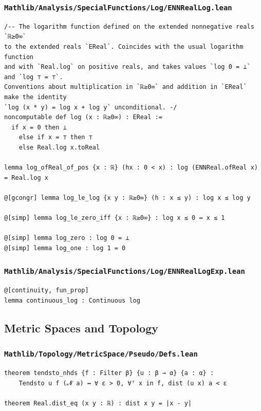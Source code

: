 \subsubsection{\texttt{Mathlib/Analysis/SpecialFunctions/Log/ENNRealLog.lean}}
\begin{lstlisting}[language=lean]
/-- The logarithm function defined on the extended nonnegative reals `ℝ≥0∞`
to the extended reals `EReal`. Coincides with the usual logarithm function
and with `Real.log` on positive reals, and takes values `log 0 = ⊥` and `log ⊤ = ⊤`.
Conventions about multiplication in `ℝ≥0∞` and addition in `EReal` make the identity
`log (x * y) = log x + log y` unconditional. -/
noncomputable def log (x : ℝ≥0∞) : EReal :=
  if x = 0 then ⊥
    else if x = ⊤ then ⊤
    else Real.log x.toReal

lemma log_ofReal_of_pos {x : ℝ} (hx : 0 < x) : log (ENNReal.ofReal x) = Real.log x

@[gcongr] lemma log_le_log {x y : ℝ≥0∞} (h : x ≤ y) : log x ≤ log y

@[simp] lemma log_le_zero_iff {x : ℝ≥0∞} : log x ≤ 0 ↔ x ≤ 1

@[simp] lemma log_zero : log 0 = ⊥
@[simp] lemma log_one : log 1 = 0
\end{lstlisting}

\subsubsection{\texttt{Mathlib/Analysis/SpecialFunctions/Log/ENNRealLogExp.lean}}
\begin{lstlisting}[language=lean]
@[continuity, fun_prop]
lemma continuous_log : Continuous log
\end{lstlisting}

\subsection{Metric Spaces and Topology}

\subsubsection{\texttt{Mathlib/Topology/MetricSpace/Pseudo/Defs.lean}}
\begin{lstlisting}[language=lean]
theorem tendsto_nhds {f : Filter β} {u : β → α} {a : α} :
    Tendsto u f (𝓝 a) ↔ ∀ ε > 0, ∀ᶠ x in f, dist (u x) a < ε

theorem Real.dist_eq (x y : ℝ) : dist x y = |x - y|
\end{lstlisting}
